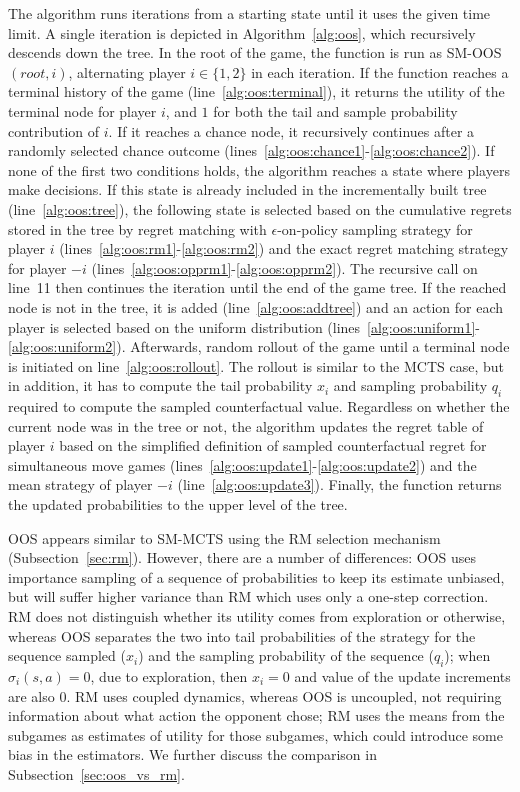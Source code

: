 The algorithm runs iterations from a starting state until it uses the given time limit. A single iteration is depicted in Algorithm~\ref{alg:oos},
which recursively descends down the tree. In the root of the game, the function is run as SM-OOS$(root, i)$, alternating player $i\in\{1,2\}$ in
each iteration. If the function reaches a terminal history of the game (line~\ref{alg:oos:terminal}), it returns the utility of the terminal node
for player $i$, and $1$ for both the tail and sample probability contribution of $i$. If it reaches a chance node, it recursively continues after
a randomly selected chance outcome (lines~\ref{alg:oos:chance1}-\ref{alg:oos:chance2}). If none of the first two conditions holds, the algorithm
reaches a state where players make decisions. If this state is already included in the incrementally built tree (line~\ref{alg:oos:tree}), the
following state is selected based on the cumulative regrets stored in the tree by regret matching with $\epsilon$-on-policy sampling strategy for
player $i$ (lines~\ref{alg:oos:rm1}-\ref{alg:oos:rm2}) and the exact regret matching strategy for player $-i$ (lines~\ref{alg:oos:opprm1}-\ref{alg:oos:opprm2}).
The recursive call on line~11 then continues the iteration until the end of the game tree. If the reached node is not in the tree,
it is added (line~\ref{alg:oos:addtree}) and an action for each player is selected based on the uniform distribution
(lines~\ref{alg:oos:uniform1}-\ref{alg:oos:uniform2}). Afterwards, random rollout of the game until a terminal node is initiated on line~\ref{alg:oos:rollout}.
The rollout is similar to the MCTS case, but in addition, it has to compute the tail probability $x_i$ and sampling probability $q_i$
required to compute the sampled counterfactual value.
Regardless on whether the current node was in the tree or not, the algorithm updates the regret table of player $i$ based on the simplified definition of sampled counterfactual regret for simultaneous move games (lines~\ref{alg:oos:update1}-\ref{alg:oos:update2}) and the mean strategy of player $-i$ (line~\ref{alg:oos:update3}).
Finally, the function returns the updated probabilities to the upper level of the tree.

OOS appears similar to SM-MCTS using the RM selection mechanism (Subsection~\ref{sec:rm}). However, there are a number of differences:
OOS uses importance sampling of a sequence of probabilities to keep its estimate unbiased, but will suffer higher variance than RM which uses only a one-step correction.
RM does not distinguish whether its utility comes from exploration or otherwise, whereas OOS separates the two into tail probabilities of the strategy for the sequence
sampled ($x_i$) and the sampling probability of the sequence ($q_i$); when $\sigma_i(s,a) = 0$, due to exploration, then $x_i = 0$ and value of the update increments
are also $0$. RM uses coupled dynamics, whereas OOS is uncoupled, not requiring information about what action the opponent chose; RM uses the means from the subgames
as estimates of utility for those subgames, which could introduce some bias in the estimators. We further discuss the comparison in Subsection~\ref{sec:oos_vs_rm}.

